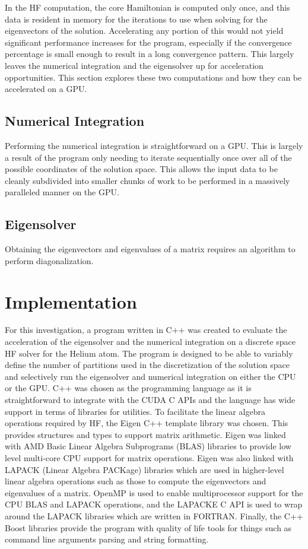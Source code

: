 \documentclass[conference, twoside]{IEEEtran}
\begin{document}
In the HF computation, the core Hamiltonian is computed only once, and this data is resident in memory for the iterations to use when solving for the eigenvectors of the solution. Accelerating any portion of this would not yield significant performance increases for the program, especially if the convergence percentage is small enough to result in a long convergence pattern. This largely leaves the numerical integration and the eigensolver up for acceleration opportunities. This section explores these two computations and how they can be accelerated on a GPU.

\subsection{Numerical Integration}

Performing the numerical integration is straightforward on a GPU. This is largely a result of the program only needing to iterate sequentially once over all of the possible coordinates of the solution space. This allows the input data to be cleanly subdivided into smaller chunks of work to be performed in a massively paralleled manner on the GPU.

\subsection{Eigensolver}

Obtaining the eigenvectors and eigenvalues of a matrix requires an algorithm to perform diagonalization. 

\section{Implementation}

For this investigation, a program written in C++ was created to evaluate the acceleration of the eigensolver and the numerical integration on a discrete space HF solver for the Helium atom. The program is designed to be able to variably define the number of partitions used in the discretization of the solution space and selectively run the eigensolver and numerical integration on either the CPU or the GPU. C++ was chosen as the programming language as it is straightforward to integrate with the CUDA C APIs and the language has wide support in terms of libraries for utilities. To facilitate the linear algebra operations required by HF, the Eigen \cite{eigen} C++ template library was chosen. This provides structures and types to support matrix arithmetic. Eigen was linked with AMD Basic Linear Algebra Subprograms (BLAS) libraries \cite{amd-blas} to provide low level multi-core CPU support for matrix operations. Eigen was also linked with LAPACK (Linear Algebra PACKage) \cite{lapack} libraries which are used in higher-level linear algebra operations such as those to compute the eigenvectors and eigenvalues of a matrix. OpenMP is used to enable multiprocessor support for the CPU BLAS and LAPACK operations, and the LAPACKE C API is used to wrap around the LAPACK libraries which are written in FORTRAN. Finally, the C++ Boost libraries provide the program with quality of life tools for things such as command line arguments parsing and string formatting.
\end{document}
